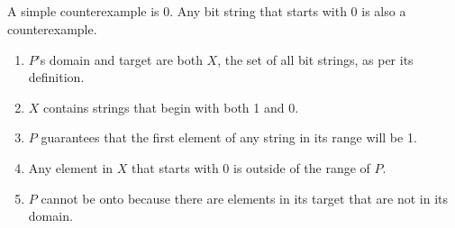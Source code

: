 \documentclass{article}
\begin{document}
\subsection{}
A simple counterexample is 0. Any bit string that starts with 0 is also a counterexample.
\begin{enumerate}
    \item $P$'s domain and target are both $X$, the set of all bit strings, as per its definition. 
    \item $X$ contains strings that begin with both 1 and 0. 
    \item $P$ guarantees that the first element of any string in its range will be 1. 
    \item Any element in $X$ that starts with 0 is outside of the range of $P$.
    \item $P$ cannot be onto because there are elements in its target that are not in its domain.
\end{enumerate}
\end{document}
